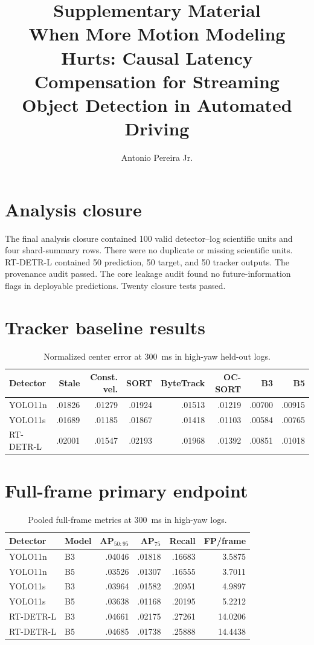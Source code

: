 \documentclass[11pt]{article}
\title{Supplementary Material\\When More Motion Modeling Hurts: Causal Latency Compensation for Streaming Object Detection in Automated Driving}
\author{Antonio Pereira Jr.}
\date{}
\begin{document}
\maketitle

\section{Analysis closure}
The final analysis closure contained 100 valid detector--log scientific units and four shard-summary rows. There were no duplicate or missing scientific units. RT-DETR-L contained 50 prediction, 50 target, and 50 tracker outputs. The provenance audit passed. The core leakage audit found no future-information flags in deployable predictions. Twenty closure tests passed.

\section{Tracker baseline results}
\begin{table}[htbp]
\centering
\caption{Normalized center error at 300~ms in high-yaw held-out logs.}
\small
\begin{tabular}{lrrrrrrr}
\toprule
Detector & Stale & Const. vel. & SORT & ByteTrack & OC-SORT & B3 & B5\\
\midrule
YOLO11n & .01826 & .01279 & .01924 & .01513 & .01219 & .00700 & .00915\\
YOLO11s & .01689 & .01185 & .01867 & .01418 & .01103 & .00584 & .00765\\
RT-DETR-L & .02001 & .01547 & .02193 & .01968 & .01392 & .00851 & .01018\\
\bottomrule
\end{tabular}
\end{table}

\section{Full-frame primary endpoint}
\begin{table}[htbp]
\centering
\caption{Pooled full-frame metrics at 300~ms in high-yaw logs.}
\small
\begin{tabular}{llrrrr}
\toprule
Detector & Model & AP$_{50:95}$ & AP$_{75}$ & Recall & FP/frame\\
\midrule
YOLO11n & B3 & .04046 & .01818 & .16683 & 3.5875\\
YOLO11n & B5 & .03526 & .01307 & .16555 & 3.7011\\
YOLO11s & B3 & .03964 & .01582 & .20951 & 4.9897\\
YOLO11s & B5 & .03638 & .01168 & .20195 & 5.2212\\
RT-DETR-L & B3 & .04661 & .02175 & .27261 & 14.0206\\
RT-DETR-L & B5 & .04685 & .01738 & .25888 & 14.4438\\
\bottomrule
\end{tabular}
\end{table}
\end{document}
